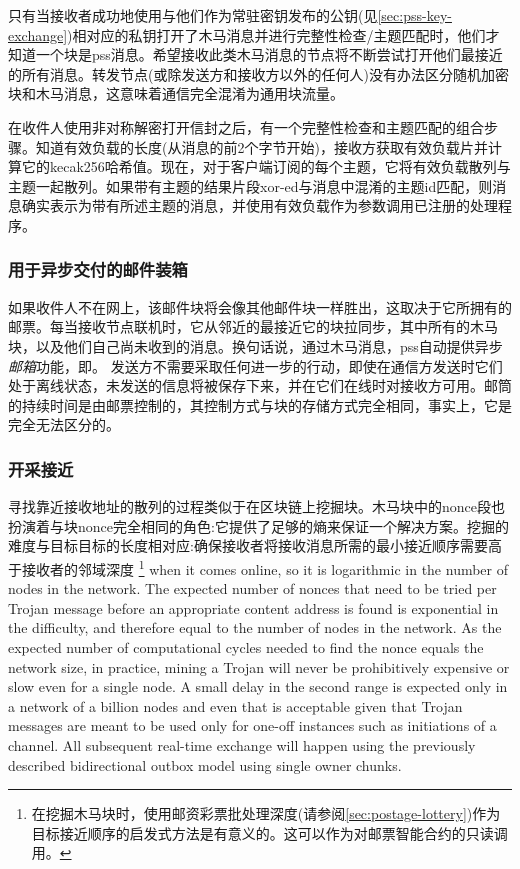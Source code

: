 只有当接收者成功地使用与他们作为常驻密钥发布的公钥(见\ref{sec:pss-key-exchange})相对应的私钥打开了木马消息并进行完整性检查/主题匹配时，他们才知道一个块是pss消息。希望接收此类木马消息的节点将不断尝试打开他们最接近的所有消息。转发节点(或除发送方和接收方以外的任何人)没有办法区分随机加密块和木马消息，这意味着通信完全混淆为通用块流量。

在收件人使用非对称解密打开信封之后，有一个完整性检查和主题匹配的组合步骤。知道有效负载的长度(从消息的前2个字节开始)，接收方获取有效负载片并计算它的kecak256哈希值。现在，对于客户端订阅的每个主题，它将有效负载散列与主题一起散列。如果带有主题的结果片段xor-ed与消息中混淆的主题id匹配，则消息确实表示为带有所述主题的消息，并使用有效负载作为参数调用已注册的处理程序。

\subsubsection{用于异步交付的邮件装箱}

如果收件人不在网上，该邮件块将会像其他邮件块一样胜出，这取决于它所拥有的邮票。每当接收节点联机时，它从邻近的最接近它的块拉同步，其中所有的木马块，以及他们自己尚未收到的消息。换句话说，通过木马消息，pss自动提供异步\emph{邮箱}功能，即。
发送方不需要采取任何进一步的行动，即使在通信方发送时它们处于离线状态，未发送的信息将被保存下来，并在它们在线时对接收方可用。邮筒的持续时间是由邮票控制的，其控制方式与块的存储方式完全相同，事实上，它是完全无法区分的。

\subsubsection{开采接近}

寻找靠近接收地址的散列的过程类似于在区块链上挖掘块。木马块中的nonce段也扮演着与块nonce完全相同的角色:它提供了足够的熵来保证一个解决方案。挖掘的难度与目标目标的长度相对应:确保接收者将接收消息所需的最小接近顺序需要高于接收者的邻域深度%
%
\footnote{在挖掘木马块时，使用邮资彩票批处理深度(请参阅\ref{sec:postage-lottery})作为目标接近顺序的启发式方法是有意义的。这可以作为对邮票智能合约的只读调用。}
%
when it comes online, so it is logarithmic in the number of nodes in the network. The expected number of nonces that need to be tried per Trojan message before an appropriate content address is found is exponential in the difficulty, and therefore equal to the number of nodes in the network. As the expected number of computational cycles needed to find the nonce equals the network size, in practice, mining a Trojan will never be prohibitively expensive or slow even for a single node. A small delay in the second range is expected only in a network of a billion nodes and even that is acceptable given that Trojan messages are meant to be used only for one-off instances such as initiations of a channel. All subsequent real-time exchange will happen using the previously described bidirectional outbox model using single owner chunks.


